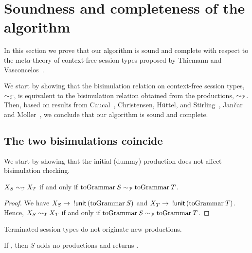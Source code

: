 \section{Soundness and completeness of the algorithm}
\label{sec:soundness}

In this section we prove that our algorithm is sound and complete
with respect to the meta-theory of context-free session types proposed
by Thiemann and Vasconcelos~\cite{thiemann2016context}.

We start by showing that the bisimulation relation on context-free
session types, $\sim_\mathcal T$, is equivalent to the bisimulation
relation obtained from the productions, $\sim_\mathcal P$.  Then, based on
results from Caucal~\cite{caucal1986decidabilite}, Christensen,
H{\"{u}}ttel, and Stirling~\cite{DBLP:journals/iandc/ChristensenHS95},
Jan{\v{c}}ar and Moller~\cite{janvcar1999techniques}, we conclude that
our algorithm is sound and complete.

\subsection{The two bisimulations coincide}

We start by showing that the initial (dummy) production does not
affect bisimulation checking.
%
\begin{lemma}
  $X_S \sim_\mathcal T X_T$ if and only if
  $\toGrammarf S \ProdEquiv \toGrammarf T$.
\end{lemma}

\begin{proof}
  We have $X_S \rightarrow\enspace \initialProd\,(\toGrammarf S)$
  and $X_T \rightarrow\enspace \initialProd\,(\toGrammarf T)$.
  Hence, $X_S \sim_\mathcal T X_T$ if and only if
  $\toGrammarf S \ProdEquiv \toGrammarf T$.
\end{proof}

Terminated session types do not originate new productions.

\begin{lemma}
  \label{lemma:terminated_session}
  If , then $S$ adds no
  productions and returns \upshape{\lstinline|[]|}.
\end{lemma}

